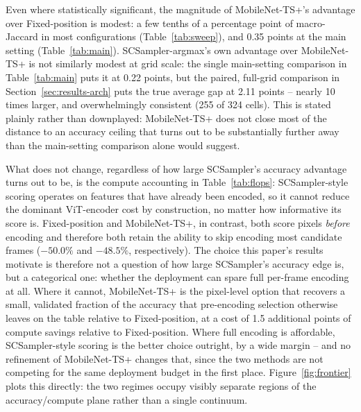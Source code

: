 \documentclass[preprint,12pt]{elsarticle}
\begin{document}
Even where statistically significant, the magnitude of MobileNet-TS+'s advantage over Fixed-position is modest: a few tenths of a percentage point of macro-Jaccard in most configurations (Table~\ref{tab:sweep}), and 0.35 points at the main setting (Table~\ref{tab:main}). SCSampler-argmax's own advantage over MobileNet-TS+ is not similarly modest at grid scale: the single main-setting comparison in Table~\ref{tab:main} puts it at 0.22 points, but the paired, full-grid comparison in Section~\ref{sec:results-arch} puts the true average gap at 2.11 points -- nearly 10 times larger, and overwhelmingly consistent (255 of 324 cells). This is stated plainly rather than downplayed: MobileNet-TS+ does not close most of the distance to an accuracy ceiling that turns out to be substantially further away than the main-setting comparison alone would suggest.

What does not change, regardless of how large SCSampler's accuracy advantage turns out to be, is the compute accounting in Table~\ref{tab:flops}: SCSampler-style scoring operates on features that have already been encoded, so it cannot reduce the dominant ViT-encoder cost by construction, no matter how informative its score is. Fixed-position and MobileNet-TS+, in contrast, both score pixels \emph{before} encoding and therefore both retain the ability to skip encoding most candidate frames ($-50.0\%$ and $-48.5\%$, respectively). The choice this paper's results motivate is therefore not a question of how large SCSampler's accuracy edge is, but a categorical one: whether the deployment can spare full per-frame encoding at all. Where it cannot, MobileNet-TS+ is the pixel-level option that recovers a small, validated fraction of the accuracy that pre-encoding selection otherwise leaves on the table relative to Fixed-position, at a cost of 1.5 additional points of compute savings relative to Fixed-position. Where full encoding is affordable, SCSampler-style scoring is the better choice outright, by a wide margin -- and no refinement of MobileNet-TS+ changes that, since the two methods are not competing for the same deployment budget in the first place. Figure~\ref{fig:frontier} plots this directly: the two regimes occupy visibly separate regions of the accuracy/compute plane rather than a single continuum.
\end{document}

